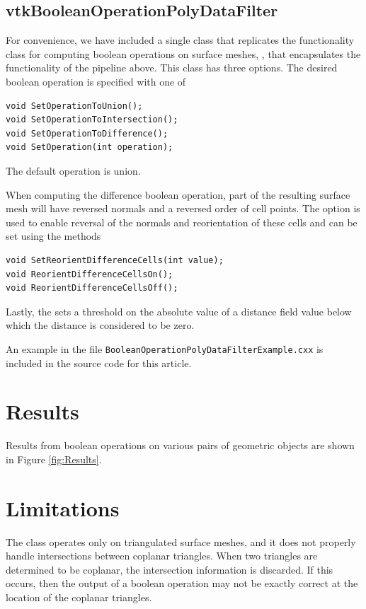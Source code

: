 \documentclass{InsightArticle}
\begin{document}
\subsection{vtkBooleanOperationPolyDataFilter}

For convenience, we have included a single class that replicates the functionality  class for computing boolean operations on surface meshes, , that encapsulates the functionality of the pipeline above. This class has three options. The desired boolean operation is specified with one of
\begin{verbatim}
void SetOperationToUnion();
void SetOperationToIntersection();
void SetOperationToDifference();
void SetOperation(int operation);
\end{verbatim}
The default operation is union.

When computing the difference boolean operation, part of the resulting surface mesh will have reversed normals and a reversed order of cell points. The  option is used to enable reversal of the normals and reorientation of these cells and can be set using the methods
\begin{verbatim}
void SetReorientDifferenceCells(int value);
void ReorientDifferenceCellsOn();
void ReorientDifferenceCellsOff();
\end{verbatim} 

Lastly, the  sets a threshold on the absolute value of a distance field value below which the distance is considered to be zero.

An example in the file \verb+BooleanOperationPolyDataFilterExample.cxx+ is included in the source code for this article.

\section{Results}

Results from boolean operations on various pairs of geometric objects are shown in Figure \ref{fig:Results}.



\section{Limitations}

The  class operates only on triangulated surface meshes, and it does not properly handle intersections between coplanar triangles. When two triangles are determined to be coplanar, the intersection information is discarded. If this occurs, then the output of a boolean operation may not be exactly correct at the location of the coplanar triangles.
\end{document}

